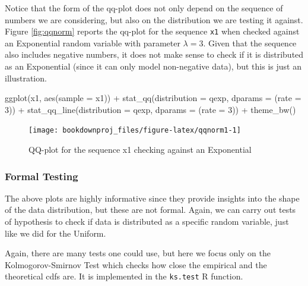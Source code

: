 \documentclass[
]{book}
\newenvironment{Shaded}{\begin{snugshade}}{\end{snugshade}}
\newcommand{\AttributeTok}[1]{\textcolor[rgb]{0.77,0.63,0.00}{#1}}
\newcommand{\DecValTok}[1]{\textcolor[rgb]{0.00,0.00,0.81}{#1}}
\newcommand{\FunctionTok}[1]{\textcolor[rgb]{0.00,0.00,0.00}{#1}}
\newcommand{\NormalTok}[1]{#1}
\newcommand{\SpecialCharTok}[1]{\textcolor[rgb]{0.00,0.00,0.00}{#1}}
\theoremstyle{definition}
\theoremstyle{definition}
\theoremstyle{definition}
\theoremstyle{definition}
\theoremstyle{remark}
\begin{document}
Notice that the form of the qq-plot does not only depend on the sequence of numbers we are considering, but also on the distribution we are testing it against. Figure \ref{fig:qqnorm} reports the qq-plot for the sequence \texttt{x1} when checked against an Exponential random variable with parameter \(\lambda =3\). Given that the sequence also includes negative numbers, it does not make sense to check if it is distributed as an Exponential (since it can only model non-negative data), but this is just an illustration.

\begin{Shaded}
\begin{Highlighting}[]
\FunctionTok{ggplot}\NormalTok{(x1, }\FunctionTok{aes}\NormalTok{(}\AttributeTok{sample =}\NormalTok{ x1)) }\SpecialCharTok{+}
   \FunctionTok{stat\_qq}\NormalTok{(}\AttributeTok{distribution =}\NormalTok{ qexp, }\AttributeTok{dparams =}\NormalTok{ (}\AttributeTok{rate =} \DecValTok{3}\NormalTok{)) }\SpecialCharTok{+}
   \FunctionTok{stat\_qq\_line}\NormalTok{(}\AttributeTok{distribution =}\NormalTok{ qexp, }\AttributeTok{dparams =}\NormalTok{ (}\AttributeTok{rate =} \DecValTok{3}\NormalTok{)) }\SpecialCharTok{+}
   \FunctionTok{theme\_bw}\NormalTok{()}
\end{Highlighting}
\end{Shaded}

\begin{figure}

{\centering \texttt{[image: bookdownproj\_files/figure-latex/qqnorm1-1]} 

}

\caption{QQ-plot for the sequence x1 checking against an Exponential}\label{fig:qqnorm1}
\end{figure}

\hypertarget{formal-testing}{%
\subsubsection{Formal Testing}\label{formal-testing}}

The above plots are highly informative since they provide insights into the shape of the data distribution, but these are not formal. Again, we can carry out tests of hypothesis to check if data is distributed as a specific random variable, just like we did for the Uniform.

Again, there are many tests one could use, but here we focus only on the Kolmogorov-Smirnov Test which checks how close the empirical and the theoretical cdfs are. It is implemented in the \texttt{ks.test} R function.
\end{document}
